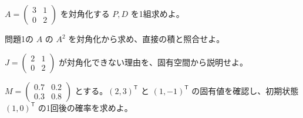 \documentclass[11pt]{article}
\begin{document}

\problem[対角化]
$A=\begin{pmatrix}3&1\\0&2\end{pmatrix}$ を対角化する $P,D$ を1組求めよ。
\workspace{38mm}

\problem[累乗]
問題1の $A$ の $A^2$ を対角化から求め、直接の積と照合せよ。
\workspace{38mm}
\newpage

\problem[対角化できない例]
$J=\begin{pmatrix}2&1\\0&2\end{pmatrix}$ が対角化できない理由を、固有空間から説明せよ。
\workspace{38mm}

\problem[状態遷移]
$M=\begin{pmatrix}0.7&0.2\\0.3&0.8\end{pmatrix}$ とする。$(2,3)^{\mathsf T}$ と $(1,-1)^{\mathsf T}$ の固有値を確認し、初期状態 $(1,0)^{\mathsf T}$ の1回後の確率を求めよ。
\workspace{38mm}
\end{document}
